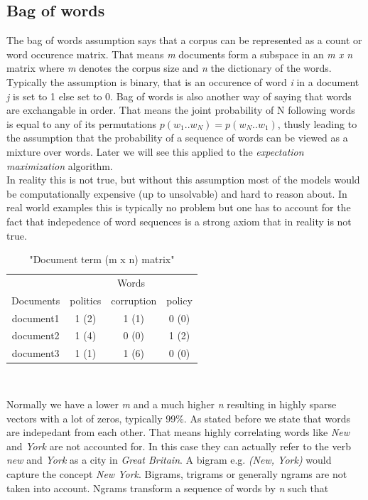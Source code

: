   \subsection{Bag of words}
    The bag of words assumption says that a corpus can be represented as a count or word occurence matrix. That means \emph{m} documents form a subspace in an \emph{m x n} matrix where \emph{m} denotes the corpus size and \emph{n} the dictionary of the words. Typically the assumption is binary, that is an occurence of word \emph{i} in a document \emph{j} is set to 1 else set to 0. Bag of words is also another way of saying that words are exchangable in order. That means the joint probability of N following words is equal to any of its permutations $p(w_1..w_N) = p(w_N..w_1)$, thusly leading to the assumption that the probability of a sequence of words can be viewed as a mixture over words. Later we will see this applied to the \emph{expectation maximization} algorithm.\\
    In reality this is not true, but without this assumption most of the models would be computationally expensive (up to unsolvable) and hard to reason about. In real world examples this is typically no problem but one has to account for the fact that indepedence of word sequences is a strong axiom that in reality is not true.

    \begin{table}[h!]
      \centering
      \begin{tabular}{c|c|c|c}
        \multicolumn{1}{r|}{} & \multicolumn{3}{c}{Words} \\
        \cline{1-4}
        Documents &   politics &   corruption &  policy  \\
        \hline
        document1 &    1 (2)   &     1 (1)    &   0 (0)  \\
        document2 &    1 (4)   &     0 (0)    &   1 (2)  \\
        document3 &    1 (1)   &     1 (6)    &   0 (0)  \\
      \end{tabular}\\
      \caption{"Document term (m x n) matrix"}
    \end{table}

    Normally we have a lower \emph{m} and a much higher \emph{n} resulting in highly sparse vectors with a lot of zeros, typically 99\%. As stated before we state that words are indepedant from each other. That means highly correlating words like \emph{New} and \emph{York} are not accounted for. In this case they can actually refer to the verb \emph{new} and \emph{York} as a city in \emph{Great Britain}. A bigram e.g. \emph{(New, York)} would capture the concept \emph{New York}. Bigrams, trigrams or generally ngrams are not taken into account. Ngrams transform a sequence of words by \emph{n} such that 

